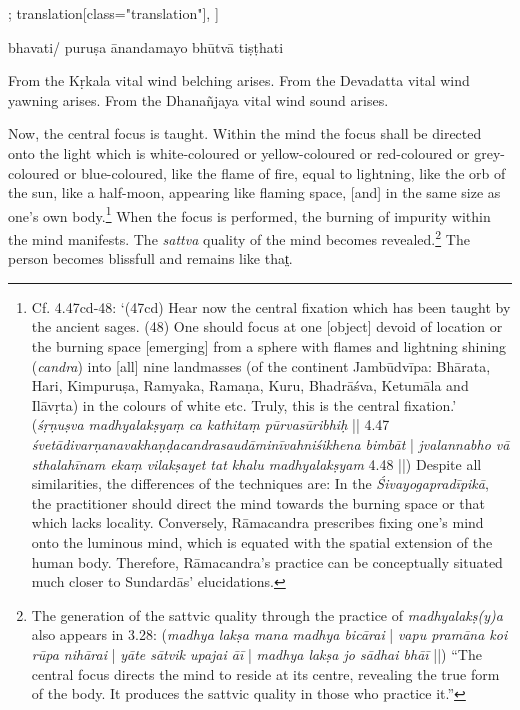 \begin{alignment}[
  texts=edition[class="edition"];
  translation[class="translation"],
  ]
\begin{edition}
\begin{prose}[p27_01]
bhavati/ puruṣa ānandamayo bhūtvā tiṣṭhati\dd{}
\end{prose}
  \end{edition}
  \begin{translation}
    \begin{tlate}[p26_02]
\noindent
From the Kṛkala vital wind belching arises. From the Devadatta vital wind yawning arises. From the Dhanañjaya vital wind sound arises.
\end{tlate}
\begin{tlate}[p27_01]
  Now, the central focus is taught. Within the mind the focus shall be directed onto the light which is white-coloured or yellow-coloured or red-coloured or grey-coloured or blue-coloured, like the flame of fire, equal to lightning, like the orb of the sun, like a half-moon, appearing like flaming space, [and] in the same size as one's own body.\footnote{Cf.  4.47cd-48: `(47cd) Hear now the central fixation which has been taught by the ancient sages. (48) One should focus at one [object] devoid of location or the burning space [emerging] from a sphere with flames and lightning shining (\textit{candra}) into [all] nine landmasses (of the continent Jambūdvīpa: Bhārata, Hari, Kimpuruṣa, Ramyaka, Ramaṇa, Kuru, Bhadrāśva, Ketumāla and Ilāvṛta) in the colours of white etc. Truly, this is the central fixation.' (\textit{śṛṇuṣva madhyalakṣyaṃ ca kathitaṃ pūrvasūribhiḥ} || 4.47 \textit{śvetādivarṇanavakhaṇḍacandrasaudāminīvahniśikhena bimbāt} | \textit{jvalannabho vā sthalahīnam ekaṃ vilakṣayet tat khalu madhyalakṣyam} 4.48 ||) Despite all similarities, the differences of the techniques are: In the \textit{Śivayogapradīpikā}, the practitioner should direct the mind towards the burning space or that which lacks locality. Conversely, Rāmacandra prescribes fixing one's mind onto the luminous mind, which is equated with the spatial extension of the human body. Therefore, Rāmacandra's practice can be conceptually situated much closer to Sundardās' elucidations.}
  When the focus is performed, the burning of impurity within the mind manifests. The \textit{sattva} quality of the mind becomes revealed.\footnote{The generation of the sattvic quality through the practice of \textit{madhyalakṣ(y)a} also appears in  3.28: (\textit{madhya lakṣa mana madhya bicārai} | \textit{vapu pramāna koi rūpa nihārai} | \textit{yāte sātvik upajai āī} | \textit{madhya lakṣa jo sādhai bhāī} ||) ``The central focus directs the mind to reside at its centre, revealing the true form of the body. It produces the sattvic quality in those who practice it.''} The person becomes blissfull and remains like that̤. 
  \flushpage 
\end{tlate}
  \end{translation}
\end{alignment}
